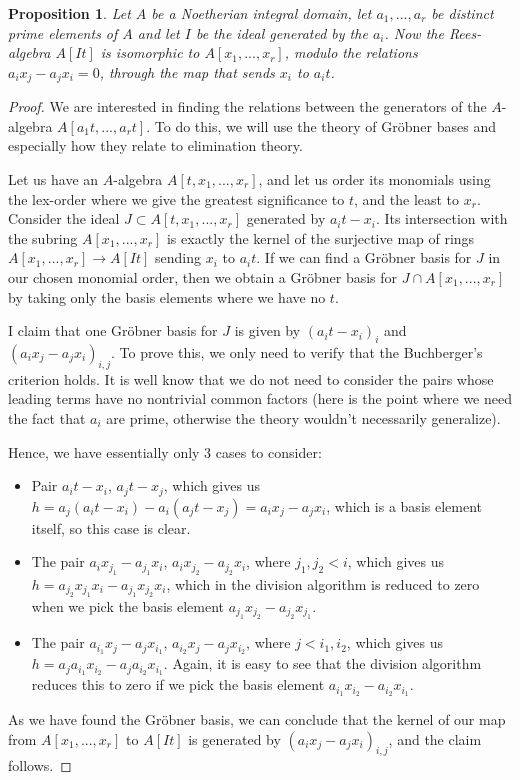\documentclass[12pt,a4paper,leqno]{article}
\theoremstyle{plain}
\newtheorem{prop}[theo]{Proposition}
\theoremstyle{definition}
\theoremstyle{remark}
\begin{document}
\begin{prop}\label{StructureOfSmoothBlowUps1}
Let $A$ be a Noetherian integral domain, let $a_1,...,a_r$ be distinct prime elements of $A$ and let $I$ be the ideal generated by the $a_i$. Now the Rees-algebra $A[It]$ is isomorphic to $A[x_1,...,x_r]$, modulo the relations $a_i x_j - a_j x_i = 0$, through the map that sends $x_i$ to $a_i t$. 
\end{prop} 
\begin{proof}
We are interested in finding the relations between the generators of the $A$-algebra $A[a_1 t, ..., a_r t]$. To do this, we will use the theory of Gröbner bases and especially how they relate to elimination theory.

Let us have an $A$-algebra $A[t,x_1,...,x_r]$, and let us order its monomials using the lex-order where we give the greatest significance to $t$, and the least to $x_r$. Consider the ideal $J \subset A[t, x_1,...,x_r]$ generated by $a_i t - x_i$. Its intersection with the subring $A[x_1,...,x_r]$ is exactly the kernel of the surjective map of rings $A[x_1,...,x_r] \to A[It]$ sending $x_i$ to $a_i t$. If we can find a Gröbner basis for $J$ in our chosen monomial order, then we obtain a Gröbner basis for $J \cap A[x_1,...,x_r]$ by taking only the basis elements where we have no $t$.

I claim that one Gröbner basis for $J$ is given by $(a_i t - x_i)_i$ and $(a_i x_j - a_j x_i)_{i,j}$. To prove this, we only need to verify that the Buchberger's criterion holds. It is well know that we do not need to consider the pairs whose leading terms have no nontrivial common factors (here is the point where we need the fact that $a_i$ are prime, otherwise the theory wouldn't necessarily generalize).

Hence, we have essentially only 3 cases to consider:
\begin{itemize}
\item Pair $a_i t - x_i$, $a_j t - x_j$, which gives us $h = a_j(a_i t - x_i) - a_i (a_j t - x_j)  = a_i x_j - a_j x_i$, which is a basis element itself, so this case is clear. 

\item The pair $a_i x_{j_1} - a_{j_1} x_i$, $a_i x_{j_2} - a_{j_2} x_i$, where $j_1,j_2 < i$, which gives us $h = a_{j_2} x_{j_1} x_i - a_{j_1} x_{j_2} x_i$, which in the division algorithm is reduced to zero when we pick the basis element $a_{j_1} x_{j_2} - a_{j_2} x_{j_1}$. 
 
\item The pair $a_{i_1} x_j - a_j x_{i_1}$, $a_{i_2} x_j - a_j x_{i_2}$, where $j < i_1, i_2$, which gives us $h = a_j a_{i_1} x_{i_2} - a_j a_{i_2} x_{i_1}$. Again, it is easy to see that the division algorithm reduces this to zero if we pick the basis element $a_{i_1} x_{i_2} - a_{i_2} x_{i_1}$. 
\end{itemize} 
As we have found the Gröbner basis, we can conclude that the kernel of our map from $A[x_1, ... , x_r]$ to $A[It]$ is generated by $(a_i x_j - a_j x_i)_{i,j}$, and the claim follows.
\end{proof}
\end{document}
